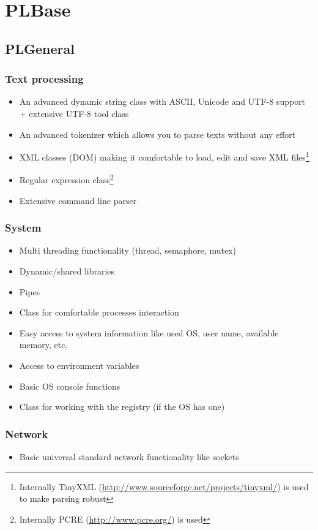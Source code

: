 \chapter{PLBase}




\section{PLGeneral}


\subsection{Text processing}
\begin{itemize}
\item{An advanced dynamic string class with ASCII, Unicode and UTF-8 support + extensive UTF-8 tool class}
\item{An advanced tokenizer which allows you to parse texts without any effort}
\item{XML classes (DOM) making it comfortable to load, edit and save XML files\footnote{Internally TinyXML (\url{http://www.sourceforge.net/projects/tinyxml/}) is used to make parsing robust}}
\item{Regular expression class\footnote{Internally PCRE (\url{http://www.pcre.org/}) is used}}
\item{Extensive command line parser}
\end{itemize}


\subsection{System}
\begin{itemize}
\item{Multi threading functionality (thread, semaphore, mutex)}
\item{Dynamic/shared libraries}
\item{Pipes}
\item{Class for comfortable processes interaction}
\item{Easy access to system information like used OS, user name, available memory, etc.}
\item{Access to environment variables}
\item{Basic OS console functions}
\item{Class for working with the registry (if the OS has one)}
\end{itemize}


\subsection{Network}
\begin{itemize}
\item{Basic universal standard network functionality like sockets}
\end{itemize}


